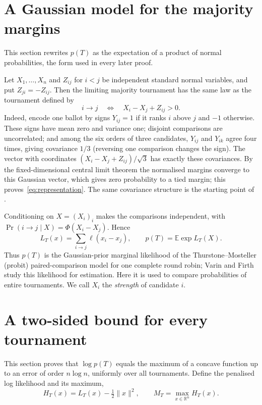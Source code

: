 \documentclass[11pt,a4paper]{article}
\theoremstyle{definition}
\newcommand{\E}{\mathbb E}
\newcommand{\R}{\mathbb R}
\begin{document}
\section{A Gaussian model for the majority margins}\label{sec:gauss}

This section rewrites $p(T)$ as the expectation of a product of normal probabilities, the form used in every later proof.

Let $X_1,\ldots,X_n$ and $Z_{ij}$ for $i<j$ be independent standard normal variables, and put $Z_{ji}=-Z_{ij}$. Then the limiting majority tournament has the same law as the tournament defined by
\begin{equation}
 i\longrightarrow j\quad\Longleftrightarrow\quad X_i-X_j+Z_{ij}>0.
 \label{eq:representation}
\end{equation}
Indeed, encode one ballot by signs $Y_{ij}=1$ if it ranks $i$ above $j$ and $-1$ otherwise. These signs have mean zero and variance one; disjoint comparisons are uncorrelated; and among the six orders of three candidates, $Y_{ij}$ and $Y_{ik}$ agree four times, giving covariance $1/3$ (reversing one comparison changes the sign). The vector with coordinates $(X_i-X_j+Z_{ij})/\sqrt{3}$ has exactly these covariances. By the fixed-dimensional central limit theorem the normalised margins converge to this Gaussian vector, which gives zero probability to a tied margin; this proves~\eqref{eq:representation}. The same covariance structure is the starting point of \cite{harrison,close}.

Conditioning on $X=(X_i)_i$ makes the comparisons independent, with $\Pr(i\to j\mid X)=\Phi(X_i-X_j)$. Hence
\begin{equation}
 L_T(x)=\sum_{i\to j}\ell(x_i-x_j),\qquad
 p(T)=\E\exp L_T(X).
 \label{eq:conditional}
\end{equation}
Thus $p(T)$ is the Gaussian-prior marginal likelihood of the Thurstone--Mosteller (probit) paired-comparison model for one complete round robin; Varin and Firth \cite[eqs.~(3)--(5)]{varin} study this likelihood for estimation. Here it is used to compare probabilities of entire tournaments. We call $X_i$ the \emph{strength} of candidate $i$.

\section{A two-sided bound for every tournament}\label{sec:mode}

This section proves that $\log p(T)$ equals the maximum of a concave function up to an error of order $n\log n$, uniformly over all tournaments. Define the penalised log likelihood and its maximum,
\[
 H_T(x)=L_T(x)-\tfrac12\|x\|^2,\qquad M_T=\max_{x\in\R^n}H_T(x).
\]
\end{document}

